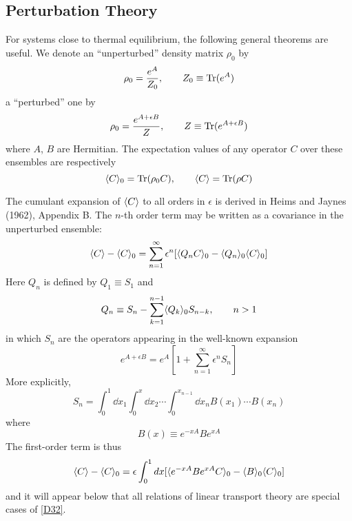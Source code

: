 \subsection{Perturbation Theory}
For systems close to thermal equilibrium, the following general theorems are useful.
We denote an ``unperturbed'' density matrix $\rho_0$ by
\begin{equation}
	\label{D24}
	\rho_0 = \frac{e^A}{Z_0}, \qquad Z_0 \equiv \operatorname{Tr}(e^A)
\end{equation}
a ``perturbed'' one by
\begin{equation}
	\label{D25}
	\rho_0 = \frac{e^{A + \epsilon B}}{Z}, \qquad Z \equiv \operatorname{Tr}(e^{A + \epsilon B})
\end{equation}
where $A$, $B$ are Hermitian.
The expectation values of any operator $C$ over these ensembles are respectively
\begin{equation}
	\langle C\rangle_0 = \operatorname{Tr}(\rho_0 C), \qquad  \langle C\rangle = \operatorname{Tr}(\rho C)
\end{equation}

The cumulant expansion of $\langle C\rangle$ to all orders in $\epsilon$ is derived in Heims and Jaynes (\cite{heims}{1962}), Appendix B.
The $n$-th order term may be written as a covariance in the unperturbed ensemble:
\begin{equation}
	\langle C\rangle - \langle C\rangle_0 = \sum_{n=1}^{\infty} \epsilon^n [\langle Q_n C\rangle_0  - \langle Q_n\rangle_0 \langle C\rangle_0]
\end{equation}
Here $Q_n$ is defined by $Q_1 \equiv S_1$ and
\begin{equation}
	Q_n \equiv S_n - \sum_{k=1}^{n-1} \langle Q_k\rangle_0 S_{n-k}, \qquad n > 1
\end{equation}
in which $S_n$ are the operators appearing in the well-known expansion
\begin{equation}
	e^{A + \epsilon B} = e^A \left[1 + \sum_{n=1}^{\infty} \epsilon^n S_n\right]
\end{equation}
More explicitly,
\begin{equation}
	S_n = \int_{0}^{1}\! \dd x_1 \int_{0}^{x}\! \dd x_2 \cdots \int_{0}^{x_{n-1}}\! \dd x_n B(x_1) \cdots B(x_n)
\end{equation}
where
\begin{equation}
	B(x) \equiv e^{-x A} B e^{x A}
\end{equation}
The first-order term is thus
\begin{equation}
	\label{D32}
	\langle C\rangle - \langle C\rangle_0 = \epsilon \int_{0}^{1} \mathop{}\!d x [\langle e^{-x A} B e^{x A} C\rangle_0 - \langle B\rangle_0 \langle C\rangle_0]
\end{equation}
and it will appear below that all relations of linear transport theory are special cases of \eqref{D32}.

